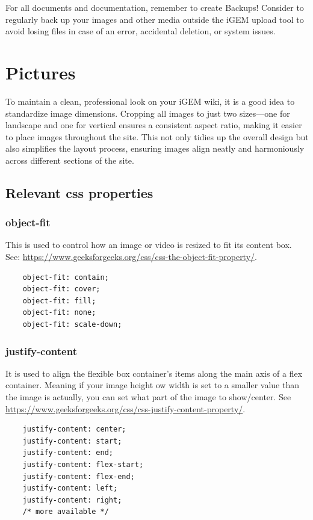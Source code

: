 
For all documents and documentation, remember to create Backups!
Consider to regularly back up your images and other media outside the iGEM upload tool to avoid losing files in case of an error, accidental deletion, or system issues.
\section{Pictures}\label{sec:pictures}
To maintain a clean, professional look on your iGEM wiki, it is a good idea to standardize image dimensions.
Cropping all images to just two sizes—one for landscape and one for vertical ensures a consistent aspect ratio, making it easier to place images throughout the site.
This not only tidies up the overall design but also simplifies the layout process, ensuring images align neatly and harmoniously across different sections of the site.

\subsection*{Relevant css properties}

\subsubsection*{object-fit}
This is used to control how an image or video is resized to fit its content box.
See: \url{https://www.geeksforgeeks.org/css/css-the-object-fit-property/}.
\begin{verbatim}
    object-fit: contain;
    object-fit: cover;
    object-fit: fill;
    object-fit: none;
    object-fit: scale-down;
\end{verbatim}

\subsubsection*{justify-content}
It is used to align the flexible box container's items along the main axis of a flex container.
Meaning if your image height ow width is set to a smaller value than the image is actually, you can set what part of the image to
show/center.
See \url{https://www.geeksforgeeks.org/css/css-justify-content-property/}.
\begin{verbatim}
    justify-content: center;
    justify-content: start;
    justify-content: end;
    justify-content: flex-start;
    justify-content: flex-end;
    justify-content: left;
    justify-content: right;
    /* more available */
\end{verbatim}


